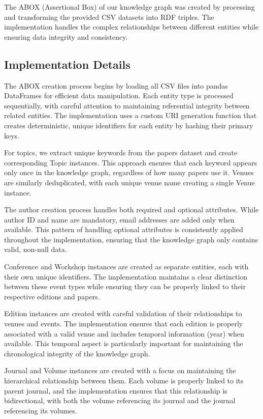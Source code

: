 \documentclass[10pt,a4paper]{article}
\begin{document}
The ABOX (Assertional Box) of our knowledge graph was created by processing and transforming the provided CSV datasets into RDF triples. The implementation handles the complex relationships between different entities while ensuring data integrity and consistency.

\subsection{Implementation Details}

The ABOX creation process begins by loading all CSV files into pandas DataFrames for efficient data manipulation. Each entity type is processed sequentially, with careful attention to maintaining referential integrity between related entities. The implementation uses a custom URI generation function that creates deterministic, unique identifiers for each entity by hashing their primary keys.

For topics, we extract unique keywords from the papers dataset and create corresponding Topic instances. This approach ensures that each keyword appears only once in the knowledge graph, regardless of how many papers use it. Venues are similarly deduplicated, with each unique venue name creating a single Venue instance.

The author creation process handles both required and optional attributes. While author ID and name are mandatory, email addresses are added only when available. This pattern of handling optional attributes is consistently applied throughout the implementation, ensuring that the knowledge graph only contains valid, non-null data.

Conference and Workshop instances are created as separate entities, each with their own unique identifiers. The implementation maintains a clear distinction between these event types while ensuring they can be properly linked to their respective editions and papers.

Edition instances are created with careful validation of their relationships to venues and events. The implementation ensures that each edition is properly associated with a valid venue and includes temporal information (year) when available. This temporal aspect is particularly important for maintaining the chronological integrity of the knowledge graph.

Journal and Volume instances are created with a focus on maintaining the hierarchical relationship between them. Each volume is properly linked to its parent journal, and the implementation ensures that this relationship is bidirectional, with both the volume referencing its journal and the journal referencing its volumes.
\end{document}
